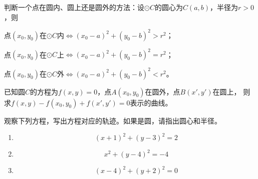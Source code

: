 \begin{corollary}[圆与点的位置关系]
    判断一个点在圆内、圆上还是圆外的方法：设\(\odot C\)的圆心为$C(a,b)$，半径为\(r>0\)，则
    
    点$(x_0,y_0)$在\(\odot C\)内\(\Leftrightarrow   (x_0-a)^2+(y_0-b)^2>r^2\)；

    点$(x_0,y_0)$在\(\odot C\)上\(\Leftrightarrow   (x_0-a)^2+(y_0-b)^2=r^2\)；

    点$(x_0,y_0)$在\(\odot C\)外\(\Leftrightarrow   (x_0-a)^2+(y_0-b)^2<r^2\)。
\end{corollary}
\begin{example}
    已知圆\(C\)的方程为\(f(x,y)=0\)，点\(A(x_0,y_0)\)在圆外，点\(B(x',y')\)在圆上，
    则求\(f(x,y)-f(x_0,y_0)+f(x',y')=0\)表示的曲线。
\end{example}
\begin{exercise}
    观察下列方程，写出方程对应的轨迹。如果是圆，请指出圆心和半径。
    \begin{enumerate}[(1)]
        \item \[(x+1)^2+(y-3)^2=2\]
        \item \[x^2+(y-4)^2=-4\]
        \item \[(x-4)^2+(y+2)^2=0\]
    \end{enumerate}
\end{exercise}

